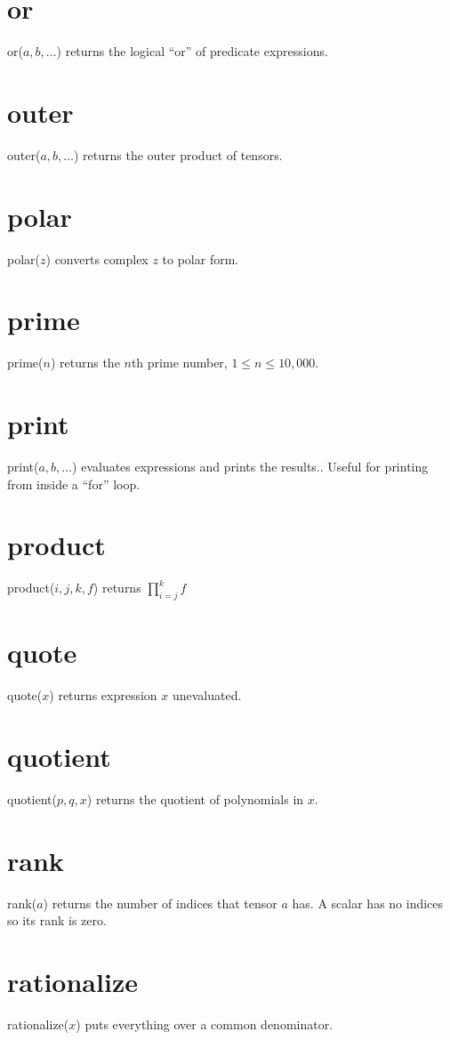 \documentclass[11pt]{article}
\begin{document}
\section*{or}
or($a,b,\ldots$) returns the logical ``or'' of predicate expressions.

\section*{outer}
outer($a,b,\ldots$) returns the outer product of tensors.

\section*{polar}
polar($z$) converts complex $z$ to polar form.

\section*{prime}
prime($n$) returns the $n$th prime number, $1\le n\le10{,}000$.

\section*{print}
print($a,b,\ldots$) evaluates expressions and prints the results..
Useful for printing from inside a ``for'' loop.

\section*{product}
product($i,j,k,f$) returns $\displaystyle\prod_{i=j}^k f$

\section*{quote}
quote($x$) returns expression $x$ unevaluated.

\section*{quotient}
quotient($p,q,x$) returns the quotient of polynomials in $x$.

\section*{rank}
rank($a$) returns the number of indices that tensor $a$ has.
A scalar has no indices so its rank is zero.

\section*{rationalize}
rationalize($x$) puts everything over a common denominator.
\end{document}
